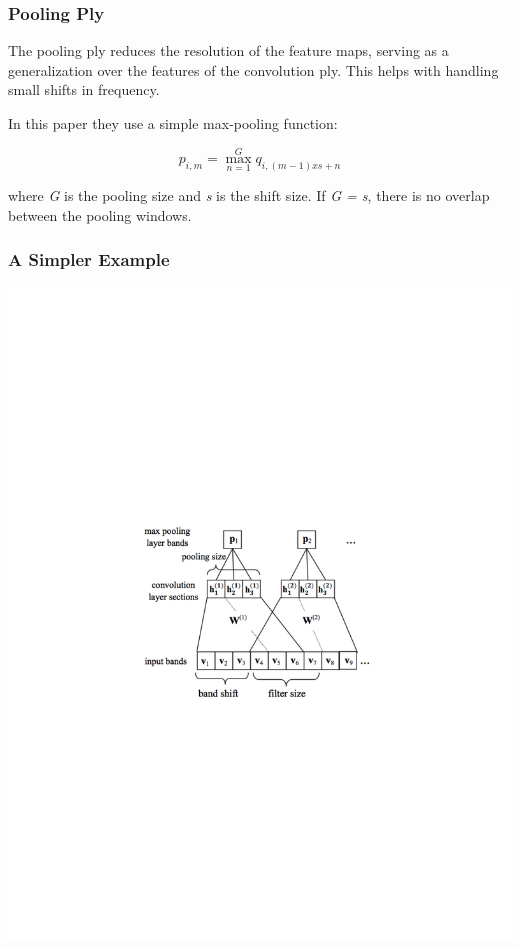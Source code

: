 \documentclass[notes]{beamer}
\begin{document}
\begin{frame}
	\frametitle{Pooling Ply}
	\begin{center}
		The pooling ply reduces the resolution of the feature maps, serving as a generalization over the features of the convolution ply. This helps with handling small shifts in frequency.
	\end{center}
	\begin{center}
		In this paper they use a simple max-pooling function:
	\end{center}
	\begin{equation*}
	p_{i,m} = \max_{n=1}^{G} q_{i, (m-1)xs+n}
	\end{equation*}
	\begin{center}
		where \textit{G} is the pooling size and \textit{s} is the shift size. If \textit{G = s}, there is no overlap between the pooling windows.
	\end{center}
	
\end{frame}

\begin{frame}
	\frametitle{A Simpler Example}
	\includegraphics[scale=1, clip=true, trim=5cm 0 0 10cm]{conv-pool.pdf}
\end{frame}
\end{document}
